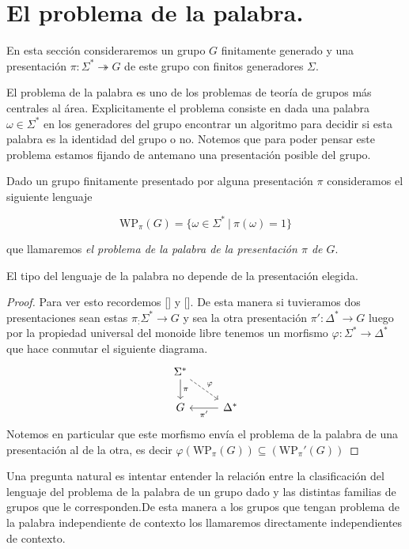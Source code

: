 \documentclass[tesis.tex]{subfiles}
\begin{document}
	
\chapter{El problema de la palabra.}
En esta sección consideraremos un grupo $G$ finitamente generado y una presentación $\pi: \Sigma^* \twoheadrightarrow  G$ de este grupo con finitos generadores $\Sigma$. 

El problema de la palabra es uno de los problemas de teoría de grupos más centrales al área. Explicitamente el problema consiste en dada una palabra $\omega \in \Sigma^*$ en los generadores del grupo encontrar un algoritmo para decidir si esta palabra es la identidad del grupo o no. Notemos que para poder pensar este problema estamos fijando de antemano una presentación posible del grupo.

Dado un grupo finitamente presentado por alguna presentación $\pi$ consideramos el siguiente lenguaje 

$$\text{WP}_\pi (G) = \{ \omega \in \Sigma^* \ | \ \pi(\omega)=1 \}$$

que llamaremos \emph{el problema de la palabra de la presentación $\pi$ de $G$}. 

\begin{lema}
	El tipo del lenguaje de la palabra no depende de la presentación elegida.
\end{lema}
\begin{proof}
	Para ver esto recordemos [] y []. De esta manera si tuvieramos dos presentaciones sean estas
$\pi_:\Sigma^* \to G$ y sea la otra presentación $\pi': \Delta^* \to G$	luego por la propiedad universal del monoide libre tenemos un morfismo $\varphi:\Sigma^* \to \Delta^*$ que hace conmutar el siguiente diagrama. 
	\[
	\begin{tikzcd}
	\Sigma^*  \arrow{d}{\pi}  \arrow[dashrightarrow]{dr}{\varphi}   \\
	G     &  \Delta^* \arrow{l}{\pi'}
	\end{tikzcd}
	\]
Notemos en particular que este morfismo envía el problema de la palabra de una presentación al de la otra, es decir $\varphi(\text{WP}_\pi (G)) \subseteq (\text{WP}_\pi' (G))$
\end{proof}

Una pregunta natural es intentar entender la relación entre la clasificación del lenguaje del problema de la palabra de un grupo dado y las distintas familias de grupos que le corresponden.De esta manera a los grupos que tengan problema de la palabra independiente de contexto los llamaremos directamente independientes de contexto. 
\end{document}
